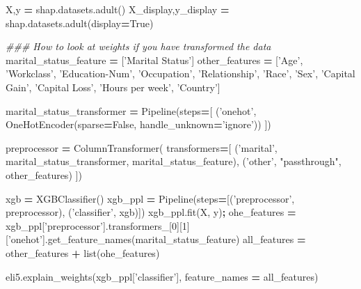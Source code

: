\documentclass[]{article}
\newenvironment{Shaded}{\begin{snugshade}}{\end{snugshade}}
\newcommand{\BuiltInTok}[1]{#1}
\newcommand{\CommentTok}[1]{\textcolor[rgb]{0.56,0.35,0.01}{\textit{#1}}}
\newcommand{\DecValTok}[1]{\textcolor[rgb]{0.00,0.00,0.81}{#1}}
\newcommand{\NormalTok}[1]{#1}
\newcommand{\OperatorTok}[1]{\textcolor[rgb]{0.81,0.36,0.00}{\textbf{#1}}}
\newcommand{\StringTok}[1]{\textcolor[rgb]{0.31,0.60,0.02}{#1}}
\newcommand{\VariableTok}[1]{\textcolor[rgb]{0.00,0.00,0.00}{#1}}
\begin{document}
\begin{Shaded}
\begin{Highlighting}[]
\NormalTok{X,y }\OperatorTok{=}\NormalTok{ shap.datasets.adult()}
\NormalTok{X_display,y_display }\OperatorTok{=}\NormalTok{ shap.datasets.adult(display}\OperatorTok{=}\VariableTok{True}\NormalTok{)}

\CommentTok{### How to look at weights if you have transformed the data}
\NormalTok{marital_status_feature }\OperatorTok{=}\NormalTok{ [}\StringTok{'Marital Status'}\NormalTok{]}
\NormalTok{other_features }\OperatorTok{=}\NormalTok{ [}\StringTok{'Age'}\NormalTok{, }\StringTok{'Workclass'}\NormalTok{, }\StringTok{'Education-Num'}\NormalTok{, }\StringTok{'Occupation'}\NormalTok{,}
       \StringTok{'Relationship'}\NormalTok{, }\StringTok{'Race'}\NormalTok{, }\StringTok{'Sex'}\NormalTok{, }\StringTok{'Capital Gain'}\NormalTok{, }\StringTok{'Capital Loss'}\NormalTok{,}
       \StringTok{'Hours per week'}\NormalTok{, }\StringTok{'Country'}\NormalTok{]}

\NormalTok{marital_status_transformer }\OperatorTok{=}\NormalTok{ Pipeline(steps}\OperatorTok{=}\NormalTok{[}
\NormalTok{                                          (}\StringTok{'onehot'}\NormalTok{, OneHotEncoder(sparse}\OperatorTok{=}\VariableTok{False}\NormalTok{, handle_unknown}\OperatorTok{=}\StringTok{'ignore'}\NormalTok{))}
\NormalTok{                                         ])}

\NormalTok{preprocessor }\OperatorTok{=}\NormalTok{ ColumnTransformer(}
\NormalTok{                                 transformers}\OperatorTok{=}\NormalTok{[}
\NormalTok{                                    (}\StringTok{'marital'}\NormalTok{, marital_status_transformer, marital_status_feature),}
\NormalTok{                                    (}\StringTok{'other'}\NormalTok{, }\StringTok{"passthrough"}\NormalTok{, other_features)}
\NormalTok{                                ])}

\NormalTok{xgb }\OperatorTok{=}\NormalTok{ XGBClassifier()}
\NormalTok{xgb_ppl }\OperatorTok{=}\NormalTok{ Pipeline(steps}\OperatorTok{=}\NormalTok{[(}\StringTok{'preprocessor'}\NormalTok{, preprocessor),}
\NormalTok{                      (}\StringTok{'classifier'}\NormalTok{, xgb)])}
\NormalTok{xgb_ppl.fit(X, y)}\OperatorTok{;}
\NormalTok{ohe_features }\OperatorTok{=}\NormalTok{ xgb_ppl[}\StringTok{'preprocessor'}\NormalTok{].transformers_[}\DecValTok{0}\NormalTok{][}\DecValTok{1}\NormalTok{][}\StringTok{'onehot'}\NormalTok{].get_feature_names(marital_status_feature)}
\NormalTok{all_features }\OperatorTok{=}\NormalTok{ other_features }\OperatorTok{+} \BuiltInTok{list}\NormalTok{(ohe_features)}

\NormalTok{eli5.explain_weights(xgb_ppl[}\StringTok{'classifier'}\NormalTok{], feature_names }\OperatorTok{=}\NormalTok{ all_features)}
\end{Highlighting}
\end{Shaded}
\end{document}
